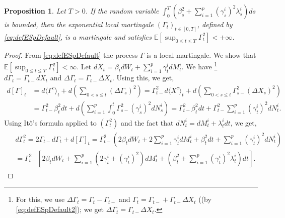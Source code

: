 \documentclass[11pt,a4paper]{article}
\numberwithin{equation}{section}
\theoremstyle{newPlain}
\newtheorem{proposition}[theorem]{Proposition}
\theoremstyle{newDefinition}
\theoremstyle{newRemark}
\begin{document}
{\begin{proposition}\label{prop:ESM-M}
    Let $T>0$. If the random variable $\int_0^T(\beta_s^2+\sum_{i=1}^p(\gamma_s^i)^2\lambda_s^i)ds$ is bounded, then the exponential local martingale $(\Gamma_t)_{ t\in[0, T]}$, defined by \eqref{eq:defESpDefault}, is a martingale and satisfies $\mathbb{E}[\sup_{0\le t\le T}\Gamma_t^2]<+\infty$.
\end{proposition}
\begin{proof}
    From \eqref{eq:defESpDefault} the process $\Gamma$ is a local martingale. We  show that $\mathbb{E}[\sup_{0\le t\le T}\Gamma_t^2]<\infty$. %
    Let $dX_t = \beta_tdW_t + \sum_{i=1}^p\gamma_t^idM_t^i$. We have \footnote{For this, we  use  $\Delta \Gamma_t = \Gamma_t-\Gamma_{t-}$  and $\Gamma_t = \Gamma_{t-} + \Gamma_{t-}\Delta X_t$ ((by \eqref{eq:defESpDefault2}); we get $\Delta \Gamma_t = \Gamma_{t-}\Delta X_t$.} $d\Gamma_t = \Gamma_{t-}dX_t$ and $\Delta \Gamma_t = \Gamma_{t-}\Delta X_t$. Using this, we get, 
    \begin{align*}
        d[\Gamma]_t &= d\langle\Gamma^c\rangle_t + d\left(\sum_{0<s\le t}(\Delta \Gamma_s)^2\right)
        =\Gamma_{t-}^2d\langle X^c\rangle_t + d\left(\sum_{0< s\le t}\Gamma_{s-}^2(\Delta X_s)^2\right)\\
        &= \Gamma_{t-}^2\beta_t^2dt + d\left(\sum_{i=1}^p\int_0^t\Gamma_{s-}^2(\gamma_s^i)^2dN_s^i\right)= \Gamma_{t-}^2\beta_t^2dt + \Gamma_{t-}^2\sum_{i=1}^p(\gamma_t^i)^2dN_t^i.
    \end{align*}
    Using It\^o's formula applied to $(\Gamma_t^2)$ and  the fact that  $dN_t^i = dM_t^i + \lambda_t^idt$, we get,
    \begin{align}\label{eq:ExpSemiProof1}
        \begin{aligned}
            &d\Gamma_t^2 =2\Gamma_{t-}d\Gamma_t + d[\Gamma]_t= \Gamma_{t-}^2(2\beta_tdW_t + 2\sum_{i=1}^p\gamma_t^idM_t^i + \beta_t^2dt + \sum_{i=1}^p(\gamma_t^i)^2dN_t^i)\\
            &=\Gamma_{t-}^2\left[2\beta_tdW_t + \sum_{i=1}^p(2\gamma_t^i + (\gamma_t^i)^2)dM_t^i + \left(\beta_t^2+\sum_{i=1}^p(\gamma_t^i)^2\lambda_t^i\right)dt\right].
        \end{aligned}
    \end{align}

\end{proof}}
\end{document}

